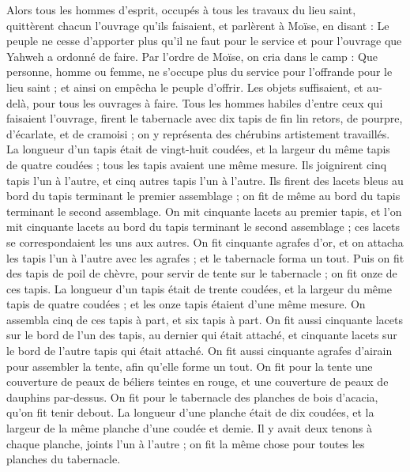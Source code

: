 \begin{multicols}{2}
Alors tous les hommes d’esprit, occupés à tous les travaux du lieu saint, quittèrent chacun l’ouvrage qu’ils faisaient,
et parlèrent à Moïse, en disant : Le peuple ne cesse d'apporter plus qu'il ne faut pour le service et pour l'ouvrage que Yahweh a ordonné de faire.
Par l’ordre de Moïse, on cria dans le camp : Que personne, homme ou femme, ne s’occupe plus du service pour l'offrande pour le lieu saint ; et ainsi on empêcha le peuple d'offrir.
Les objets suffisaient, et au-delà, pour tous les ouvrages à faire.
Tous les hommes habiles d'entre ceux qui faisaient l'ouvrage, firent le tabernacle avec dix tapis de fin lin retors, de pourpre, d'écarlate, et de cramoisi ; on y représenta des chérubins artistement travaillés.
La longueur d'un tapis était de vingt-huit coudées, et la largeur du même tapis de quatre coudées ; tous les tapis avaient une même mesure.
Ils joignirent cinq tapis l'un à l'autre, et cinq autres tapis l'un à l'autre.
Ils firent des lacets bleus au bord du tapis terminant le premier assemblage ; on fit de même au bord du tapis terminant le second assemblage.
On mit cinquante lacets au premier tapis, et l’on mit cinquante lacets au bord du tapis terminant le second assemblage ; ces lacets se correspondaient les uns aux autres.
On fit cinquante agrafes d'or, et on attacha les tapis l'un à l'autre avec les agrafes ; et le tabernacle forma un tout.
Puis on fit des tapis de poil de chèvre, pour servir de tente sur le tabernacle ; on fit onze de ces tapis.
La longueur d'un tapis était de trente coudées, et la largeur du même tapis de quatre coudées ; et les onze tapis étaient d'une même mesure.
On assembla cinq de ces tapis à part, et six tapis à part.
On fit aussi cinquante lacets sur le bord de l'un des tapis, au dernier qui était attaché, et cinquante lacets sur le bord de l'autre tapis qui était attaché.
On fit aussi cinquante agrafes d'airain pour assembler la tente, afin qu’elle forme un tout.
On fit pour la tente une couverture de peaux de béliers teintes en rouge, et une couverture de peaux de dauphins par-dessus.
On fit pour le tabernacle des planches de bois d’acacia, qu'on fit tenir debout.
La longueur d’une planche était de dix coudées, et la largeur de la même planche d'une coudée et demie.
Il y avait deux tenons à chaque planche, joints l'un à l'autre ; on fit la même chose pour toutes les planches du tabernacle.

\end{multicols}
